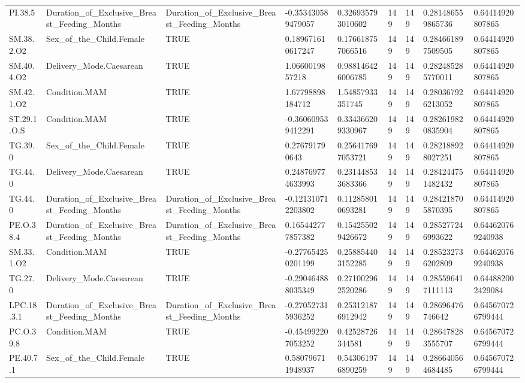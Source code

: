 \begin{longtable}{lllllllll}
PI.38.5 & Duration\_of\_Exclusive\_Breast\_Feeding\_Months & Duration\_of\_Exclusive\_Breast\_Feeding\_Months & -0.353430589479057 & 0.326935793010602 & 149 & 149 & 0.281486559865736 & 0.64414920807865 \\
SM.38.2.O2 & Sex\_of\_the\_Child.Female & TRUE & 0.189671610617247 & 0.176618757066516 & 149 & 149 & 0.284661897509505 & 0.64414920807865 \\
SM.40.4.O2 & Delivery\_Mode.Caesarean & TRUE & 1.0660019857218 & 0.988146426006785 & 149 & 149 & 0.282485285770011 & 0.64414920807865 \\
SM.42.1.O2 & Condition.MAM & TRUE & 1.67798898184712 & 1.54857933351745 & 149 & 149 & 0.280367926213052 & 0.64414920807865 \\
ST.29.1.O.S & Condition.MAM & TRUE & -0.360609539412291 & 0.334366209330967 & 149 & 149 & 0.282619820835904 & 0.64414920807865 \\
TG.39.0 & Sex\_of\_the\_Child.Female & TRUE & 0.276791790643 & 0.256417697053721 & 149 & 149 & 0.282188928027251 & 0.64414920807865 \\
TG.44.0 & Delivery\_Mode.Caesarean & TRUE & 0.248769774633993 & 0.231448533683366 & 149 & 149 & 0.284244751482432 & 0.64414920807865 \\
TG.44.0 & Duration\_of\_Exclusive\_Breast\_Feeding\_Months & Duration\_of\_Exclusive\_Breast\_Feeding\_Months & -0.121310712203802 & 0.112858010693281 & 149 & 149 & 0.284218705870395 & 0.64414920807865 \\
PE.O.38.4 & Duration\_of\_Exclusive\_Breast\_Feeding\_Months & Duration\_of\_Exclusive\_Breast\_Feeding\_Months & 0.165442777857382 & 0.154255029426672 & 149 & 149 & 0.285277246993622 & 0.644620769240938 \\
SM.33.1.O2 & Condition.MAM & TRUE & -0.277654250201199 & 0.258854403152285 & 149 & 149 & 0.285232736202809 & 0.644620769240938 \\
TG.27.0 & Delivery\_Mode.Caesarean & TRUE & -0.290464888035349 & 0.271002962520286 & 149 & 149 & 0.285596417111113 & 0.644882002429084 \\
LPC.18.3.1 & Duration\_of\_Exclusive\_Breast\_Feeding\_Months & Duration\_of\_Exclusive\_Breast\_Feeding\_Months & -0.270527315936252 & 0.253121876912942 & 149 & 149 & 0.28696476746642 & 0.645670726799444 \\
PC.O.39.8 & Condition.MAM & TRUE & -0.454992207053252 & 0.42528726344581 & 149 & 149 & 0.286478283555707 & 0.645670726799444 \\
PE.40.7.1 & Sex\_of\_the\_Child.Female & TRUE & 0.580796711948937 & 0.543061976890259 & 149 & 149 & 0.286640564684485 & 0.645670726799444 \\

\end{longtable}

